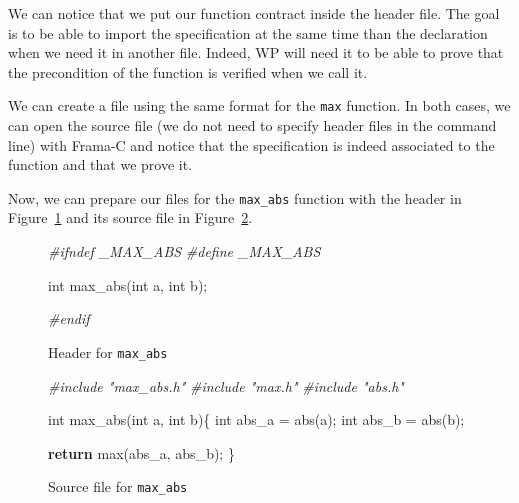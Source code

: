 \documentclass[12pt,francais,]{scrbook}
\newenvironment{Shaded}{}{}
\newcommand{\KeywordTok}[1]{\textcolor[rgb]{0.00,0.44,0.13}{\textbf{{#1}}}}
\newcommand{\DataTypeTok}[1]{\textcolor[rgb]{0.56,0.13,0.00}{{#1}}}
\newcommand{\CommentTok}[1]{\textcolor[rgb]{0.38,0.63,0.69}{\textit{{#1}}}}
\newcommand{\NormalTok}[1]{{#1}}
\begin{document}
We can notice that we put our function contract inside the header file.
The goal is to be able to import the specification at the same time than
the declaration when we need it in another file. Indeed, WP will need it
to be able to prove that the precondition of the function is verified
when we call it.

We can create a file using the same format for the \texttt{max}
function. In both cases, we can open the source file (we do not need to
specify header files in the command line) with Frama-C and notice that
the specification is indeed associated to the function and that we prove
it.

Now, we can prepare our files for the \texttt{max\_abs} function with
the header in Figure~\ref{fig:3-4-hd2} and its source file in
Figure~\ref{fig:3-4-src2}.

\begin{figure}
  \centering
\begin{footnotesize}\begin{Shaded}
\begin{Highlighting}[]
\CommentTok{#ifndef _MAX_ABS}
\CommentTok{#define _MAX_ABS}

\DataTypeTok{int} \NormalTok{max_abs(}\DataTypeTok{int} \NormalTok{a, }\DataTypeTok{int} \NormalTok{b);}

\CommentTok{#endif}
\end{Highlighting}
\end{Shaded}\end{footnotesize}
\caption{Header for \texttt{max\_abs}}
\label{fig:3-4-hd2}
\end{figure}

\begin{figure}
  \centering
\begin{footnotesize}\begin{Shaded}
\begin{Highlighting}[]
\CommentTok{#include "max_abs.h"}
\CommentTok{#include "max.h"}
\CommentTok{#include "abs.h"}

\DataTypeTok{int} \NormalTok{max_abs(}\DataTypeTok{int} \NormalTok{a, }\DataTypeTok{int} \NormalTok{b)\{}
  \DataTypeTok{int} \NormalTok{abs_a = abs(a);}
  \DataTypeTok{int} \NormalTok{abs_b = abs(b);}

  \KeywordTok{return} \NormalTok{max(abs_a, abs_b);}
\NormalTok{\}}
\end{Highlighting}
\end{Shaded}\end{footnotesize}
\caption{Source file for \texttt{max\_abs}}
\label{fig:3-4-src2}
\end{figure}
\end{document}
